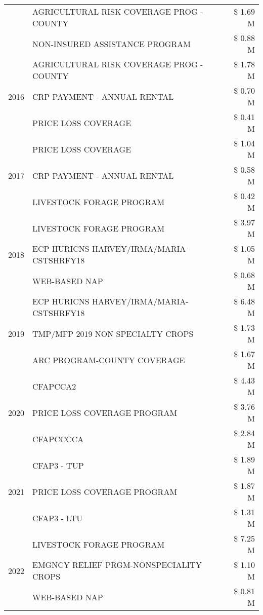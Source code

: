 \begin{tabular}{llr}
 & AGRICULTURAL RISK COVERAGE PROG - COUNTY & \$ 1.69 M \\
 & NON-INSURED ASSISTANCE PROGRAM & \$ 0.88 M \\
\cline{1-3}
\multirow[t]{3}{*}{2016} & AGRICULTURAL RISK COVERAGE PROG - COUNTY & \$ 1.78 M \\
 & CRP PAYMENT - ANNUAL RENTAL & \$ 0.70 M \\
 & PRICE LOSS COVERAGE & \$ 0.41 M \\
\cline{1-3}
\multirow[t]{3}{*}{2017} & PRICE LOSS COVERAGE & \$ 1.04 M \\
 & CRP PAYMENT - ANNUAL RENTAL & \$ 0.58 M \\
 & LIVESTOCK FORAGE PROGRAM & \$ 0.42 M \\
\cline{1-3}
\multirow[t]{3}{*}{2018} & LIVESTOCK FORAGE PROGRAM & \$ 3.97 M \\
 & ECP HURICNS HARVEY/IRMA/MARIA-CSTSHRFY18 & \$ 1.05 M \\
 & WEB-BASED NAP & \$ 0.68 M \\
\cline{1-3}
\multirow[t]{3}{*}{2019} & ECP HURICNS HARVEY/IRMA/MARIA-CSTSHRFY18 & \$ 6.48 M \\
 & TMP/MFP 2019 NON SPECIALTY CROPS & \$ 1.73 M \\
 & ARC PROGRAM-COUNTY COVERAGE & \$ 1.67 M \\
\cline{1-3}
\multirow[t]{3}{*}{2020} & CFAPCCA2 & \$ 4.43 M \\
 & PRICE LOSS COVERAGE PROGRAM & \$ 3.76 M \\
 & CFAPCCCCA & \$ 2.84 M \\
\cline{1-3}
\multirow[t]{3}{*}{2021} & CFAP3 - TUP & \$ 1.89 M \\
 & PRICE LOSS COVERAGE PROGRAM & \$ 1.87 M \\
 & CFAP3 - LTU & \$ 1.31 M \\
\cline{1-3}
\multirow[t]{3}{*}{2022} & LIVESTOCK FORAGE PROGRAM & \$ 7.25 M \\
 & EMGNCY RELIEF PRGM-NONSPECIALITY CROPS & \$ 1.10 M \\
 & WEB-BASED NAP & \$ 0.81 M \\
\cline{1-3}
\bottomrule
\end{tabular}
